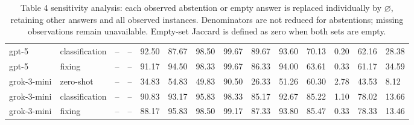 \begin{table}[!t]
\begin{tabular}{llllllllllllll}
gpt-5 & classification & -- & -- & 92.50 & 87.67 & 98.50 & 99.67 & 89.67 & 93.60 & 70.13 & 0.20 & 62.16 & 28.38 \\
gpt-5 & fixing & -- & -- & 91.17 & 94.50 & 98.33 & 99.67 & 86.33 & 94.00 & 63.61 & 0.33 & 61.17 & 34.59 \\
grok-3-mini & zero-shot & -- & -- & 34.83 & 54.83 & 49.83 & 90.50 & 26.33 & 51.26 & 60.30 & 2.78 & 43.53 & 8.12 \\
grok-3-mini & classification & -- & -- & 90.83 & 93.17 & 95.83 & 98.33 & 85.17 & 92.67 & 85.22 & 1.10 & 78.02 & 13.66 \\
grok-3-mini & fixing & -- & -- & 88.17 & 95.83 & 98.50 & 99.17 & 87.33 & 93.80 & 85.47 & 0.33 & 78.33 & 13.46 \\
\bottomrule
\end{tabular}
\caption{Table 4 sensitivity analysis: each observed abstention or empty answer is replaced individually by $\varnothing$, retaining other answers and all observed instances. Denominators are not reduced for abstentions; missing observations remain unavailable. Empty-set Jaccard is defined as zero when both sets are empty.}
\label{tab:consistency_per_action_filtering}
\end{table}
